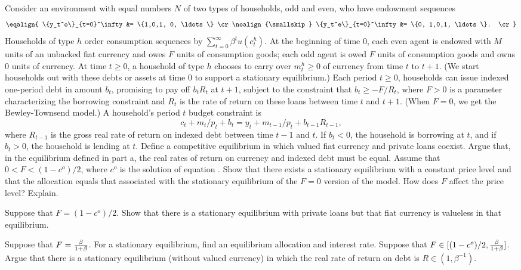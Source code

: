 \medskip
{}
\medskip\noindent
   Consider an environment with equal numbers $N$ of two types
of households, odd and even, who have endowment sequences
$$\eqalign{ \{y_t^o\}_{t=0}^\infty &= \{1,0,1, 0, \ldots\} \cr
\noalign{\smallskip}
     \{y_t^e\}_{t=0}^\infty &= \{0, 1,0,1, \ldots\}. \cr}$$
Households of type $h$ order consumption sequences by
$\sum_{t=0}^\infty \beta^t u(c_t^h) .$  At the beginning
of time $0$, each even agent is endowed with $M$ units
of an unbacked fiat currency and owes  $F$ units of consumption
goods; each odd agent is owed $F$ units of consumption
goods and owns $0$ units of currency.  At time $t \geq 0$,
a household of type $h$ chooses to carry over
$m_t^h \geq 0$ of currency from time $t$ to $t+1$.
(We start households out with these debts or assets at time $0$
to support a stationary equilibrium.)  Each period $t \geq 0$,
 households can issue indexed one-period debt in amount
$b_t$, promising to pay off $b_t R_t$ at $t+1$, subject to
the constraint that $b_t \geq -F/R_t$, where $F>0$ is a parameter
characterizing the borrowing constraint and $R_t$
is the rate of return on these loans between time
$t$ and $t+1$.  (When $F = 0$, we get the Bewley-Townsend model.)
A household's period $t$ budget constraint is
$$ c_t + m_t/p_t + b_t = y_t + m_{t-1}/p_t + b_{t-1}R_{t-1},$$
where $R_{t-1}$ is the gross real rate of return on indexed debt
between time $t-1$ and  $t$.  If $b_t<0$, the  household is borrowing
at $t$, and if $b_t>0$, the household is lending at $t$.
\medskip
{}  Define a competitive equilibrium in which
valued fiat currency and private loans coexist.
\medskip
{}  Argue that, in the equilibrium defined in part
a, the real rates of return on currency and indexed debt must be
equal.
\medskip
{}  Assume that $0 < F< (1-c^o)/2$, where $c^o$ is
the solution of equation .  Show that there exists a
stationary equilibrium with a constant price level and that the
allocation equals that associated with the stationary equilibrium
of the $F=0$ version of the model. How does $F$ affect the price
level?  Explain.

\medskip
{}  Suppose that $F=(1-c^o)/2$.  Show that there is
a stationary
 equilibrium with private loans but that fiat currency is valueless in
 that equilibrium.

\medskip
{}  Suppose that $F={\beta \over 1+ \beta}$.  For a
stationary equilibrium, find an equilibrium  allocation and
interest rate.
\medskip
{}  Suppose that $F \in [(1-c^o)/2, {\beta \over
1+\beta}]$. Argue that there is a stationary equilibrium (without
valued currency) in which the real rate of return on debt is $R
\in (1, \beta^{-1}).$

